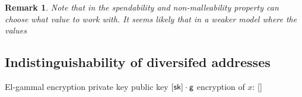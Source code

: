 \documentclass[11pt]{article}
\numberwithin{equation}{section} %
\numberwithin{figure}{section} %
\newtheorem{remark}[thm]{Remark}
\newcommand{\inp}{\ensuremath{\mathsf{inp}}\xspace}
\begin{document}
\begin{remark}
 Note that in the spendability and non-malleability property \adv can choose what value \nf to work with.
 It seems likely that in a weaker model where the values \nf 
\end{remark}





% 
% 
% 
% 
% 
% 
% 
% 
% 
% 


\subsection{Indistinguishability of diversifed addresses}


El-gammal encryption
private key \sk
public key $[\mathsf{sk}]\cdot \mathsf{g}$
encryption of $x$: [\sk]


\end{document}
